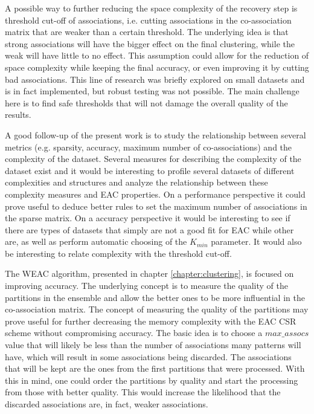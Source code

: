 A possible way to further reducing the space complexity of the recovery step is threshold cut-off of associations, i.e. cutting associations in the co-association matrix that are weaker than a certain threshold.
The underlying idea is that strong associations will have the bigger effect on the final clustering, while the weak will have little to no effect.
This assumption could allow for the reduction of space complexity while keeping the final accuracy, or even improving it by cutting bad associations.
This line of research was briefly explored on small datasets and is in fact implemented, but robust testing was not possible.
The main challenge here is to find safe thresholds that will not damage the overall quality of the results.

A good follow-up of the present work is to study the relationship between several metrics (e.g. sparsity, accuracy, maximum number of co-associations) and the complexity of the dataset.
Several measures for describing the complexity of the dataset exist \cite{Ho2002} and it would be interesting to profile several datasets of different complexities and structures and analyze the relationship between these complexity measures and EAC properties.
On a performance perspective it could prove useful to deduce better rules to set the maximum number of associations in the sparse matrix.
On a accuracy perspective it would be interesting to see if there are types of datasets that simply are not a good fit for EAC while other are, as well as perform automatic choosing of the $K_{min}$ parameter.
It would also be interesting to relate complexity with the threshold cut-off.

The WEAC algorithm, presented in chapter \ref{chapter:clustering}, is focused on improving accuracy.
The underlying concept is to measure the quality of the partitions in the ensemble and allow the better ones to be more influential in the co-association matrix.
The concept of measuring the quality of the partitions may prove useful for further decreasing the memory complexity with the EAC CSR scheme without compromising accuracy.
The basic idea is to choose a $max\_assocs$ value that will likely be less than the number of associations many patterns will have, which will result in some associations being discarded.
The associations that will be kept are the ones from the first partitions that were processed.
With this in mind, one could order the partitions by quality and start the processing from those with better quality.
This would increase the likelihood that the discarded associations are, in fact, weaker associations.

